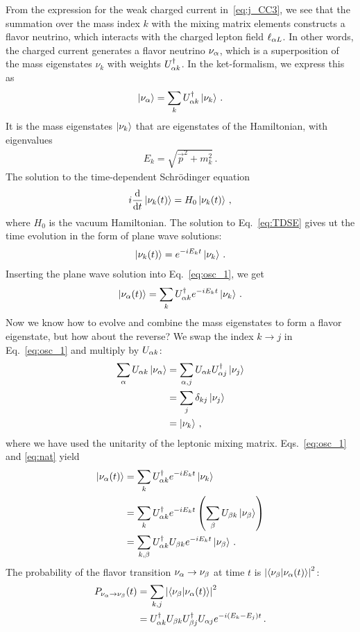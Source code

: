 From the expression for the weak charged current in~\ref{eq:j_CC3}, we see that the summation over the mass index $k$ with the mixing matrix elements constructs a flavor neutrino, which interacts with the charged lepton field $\ell_{\alpha L}$.
In other words, the charged current generates a flavor neutrino $\nu_\alpha$, which is a superposition of the mass eigenstates 
$\nu_k$ with weights $U_{\alpha k}^\dagger$. In the ket-formalism, we express this as
\begin{align}\label{eq:osc_1}
    \ket{\nu_\alpha} = \sum_k U^\dagger_{\alpha k} \ket{\nu_k}\,.
\end{align}
It is the mass eigenstates $\ket{\nu_k}$ that are eigenstates of the Hamiltonian, with eigenvalues
\begin{align}\label{eq:disp}
    E_k = \sqrt{\vec{p}^2 + m_k^2}\,.
\end{align}
The solution to the time-dependent Schrödinger equation 
\begin{align}\label{eq:TDSE}
    i \dv{}{t} \ket{\nu_k(t)} = H_0\ket{\nu_k(t)}\,,
\end{align}
where $H_0$ is the vacuum Hamiltonian. 
The solution to Eq.~\ref{eq:TDSE} gives ut the time evolution
in the form of plane wave solutions: 
\begin{align}
    \ket{\nu_k(t)} = e^{-iE_kt}\ket{\nu_k}\,.
\end{align}
Inserting the plane wave solution into Eq.~\ref{eq:osc_1}, we get 
\begin{align}\label{eq:nat}
    \ket{\nu_\alpha(t)} = \sum_k U^\dagger_{\alpha k} e^{-iE_kt}\ket{\nu_k}\,.
\end{align}
Now we know how to evolve and combine the mass eigenstates to form a flavor eigenstate, but how about the reverse? We swap the index $k\to j$ in Eq.~\ref{eq:osc_1} and multiply by $U_{\alpha k}$:
\begin{align}\label{eq:osc_k}
    \sum_\alpha U_{\alpha k}\ket{\nu_\alpha} &= \sum_{\alpha, j} U_{\alpha k} U_{\alpha j}^\dagger \ket{\nu_j} \nonumber \\
                              &= \sum_{j} \delta_{kj} \ket{\nu_j} \nonumber \\
                              &= \ket{\nu_k}\,,
\end{align}
where we have used the unitarity of the leptonic mixing matrix. Eqs.~\ref{eq:osc_1} and \ref{eq:nat} yield 
\begin{align}
    \ket{\nu_\alpha(t)} &= \sum_k U^\dagger_{\alpha k} e^{-iE_kt}\ket{\nu_k} \nonumber \\
                 &= \sum_k U^\dagger_{\alpha k} e^{-iE_kt}\left(\sum_\beta U_{\beta k}\ket{\nu_\beta}\right) \nonumber \\
                 &= \sum_{k,\beta} U^\dagger_{\alpha k}U_{\beta k} e^{-iE_kt} \ket{\nu_\beta}\,.
\end{align}
The probability of the flavor transition $\nu_\alpha \to \nu_\beta$ at time $t$ is $\abs{\bra{\nu_\beta}\ket{\nu_\alpha (t)}}^2$:
\begin{align}
    P_{\nu_\alpha \to \nu_\beta}(t) &= \sum_{k,j} \abs{{\bra{\nu_\beta}\ket{\nu_\alpha (t)}}}^2 \nonumber \\
    &= U^\dagger_{\alpha k}U_{\beta k}U^\dagger_{\beta j}U_{\alpha j} e^{-i(E_k-E_j)t}\,.
\end{align}

